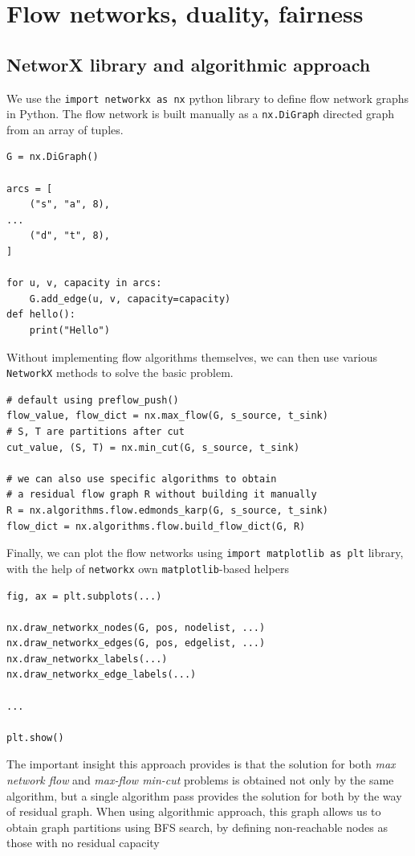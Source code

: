 \documentclass[12pt, openany]{article}
\begin{document}
\newpage
\section{Flow networks, duality, fairness}
\subsection{NetworX library and algorithmic approach}

We use the \texttt{import networkx as nx} python library to define flow network graphs in Python. The flow network is built manually as a \texttt{nx.DiGraph} directed graph from an array of tuples.

\begin{verbatim}
G = nx.DiGraph()

arcs = [
    ("s", "a", 8),
...
    ("d", "t", 8),
]

for u, v, capacity in arcs:
    G.add_edge(u, v, capacity=capacity)
def hello():
    print("Hello")
\end{verbatim}

Without implementing flow algorithms themselves, we can then use various \texttt{NetworkX} methods to solve the basic problem.
\begin{verbatim}
# default using preflow_push()
flow_value, flow_dict = nx.max_flow(G, s_source, t_sink)
# S, T are partitions after cut
cut_value, (S, T) = nx.min_cut(G, s_source, t_sink)

# we can also use specific algorithms to obtain
# a residual flow graph R without building it manually
R = nx.algorithms.flow.edmonds_karp(G, s_source, t_sink)
flow_dict = nx.algorithms.flow.build_flow_dict(G, R)
\end{verbatim}

Finally, we can plot the flow networks using \texttt{import matplotlib as plt} library, with the help of \texttt{networkx} own \texttt{matplotlib}-based helpers

\begin{verbatim}
fig, ax = plt.subplots(...)

nx.draw_networkx_nodes(G, pos, nodelist, ...)
nx.draw_networkx_edges(G, pos, edgelist, ...)
nx.draw_networkx_labels(...)
nx.draw_networkx_edge_labels(...)

...

plt.show()
\end{verbatim}

The important insight this approach provides is that the solution for both \textit{max network flow} and \textit{max-flow min-cut} problems is obtained not only by the same algorithm, but a single algorithm pass provides the solution for both by the way of residual graph. When using algorithmic approach, this graph allows us to obtain graph partitions using BFS search, by defining non-reachable nodes as those with no residual capacity
\end{document}
